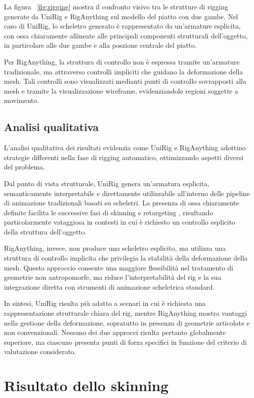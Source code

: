 La figura ~\ref{fig:rigging} mostra il confronto visivo tra le strutture di rigging generate da UniRig e RigAnything sul modello del piatto con due gambe. Nel caso di UniRig, lo scheletro generato è rappresentato da un'armature esplicita, con ossa chiaramente allineate alle principali componenti strutturali dell'oggetto, in particolare alle due gambe e alla poszione centrale del piatto.

Per RigAnything, la struttura di controllo non è espressa tramite un'armature tradizionale, ma attraverso controlli impliciti che guidano la deformazione della mesh. Tali controlli sono visualizzati medianti punti di controllo sovrapposti alla mesh e tramite la visualizzazione wireframe, evidenziandole regioni soggette a movimento.

\subsection{Analisi qualitativa}
L'analisi qualitativa dei risultati evidenzia come UniRig e RigAnything adottino strategie differenti nella fase di rigging automatico, ottimizzando aspetti diversi del problema.

Dal punto di vista strutturale, UniRig genera un'armatura esplicita, semanticamente interpretabile e direttamente utilizzabile all'interno delle pipeline di animazione tradizionali basati su scheletri. La presenza di ossa chiaramente definite facilita le successive fasi di skinning e retargeting , risultando particolarmente vataggiosa in contesti in cui è richiesto un controllo esplicito della struttura dell'oggetto.

RigAnything, invece, non produce uno scheletro esplicito, ma utilizza una struttura di controllo implicita che privilegia la stabilità della deformazione della mesh. Questo approccio consente una maggiore flessibilità nel tratamento di geometrie non antropomorfe, ma riduce l'interpretabilità del rig e la sua integrazione diretta con strumenti di animazione scheletrica standard.

In sintesi, UniRig risulta più adatto a scenari in cui è richiesta una rappresentazione strutturale chiara del rig, mentre RigAnything mostra vantaggi nella gestione della deformazione, sopratutto in presenza di geometrie articolate e non convenzionali. Nessuno dei due approcci risulta pertanto globalmente superiore, ma ciascuno presenta punti di forza specifici in funzione del criterio di valutazione considerato.

\section{Risultato dello skinning}

